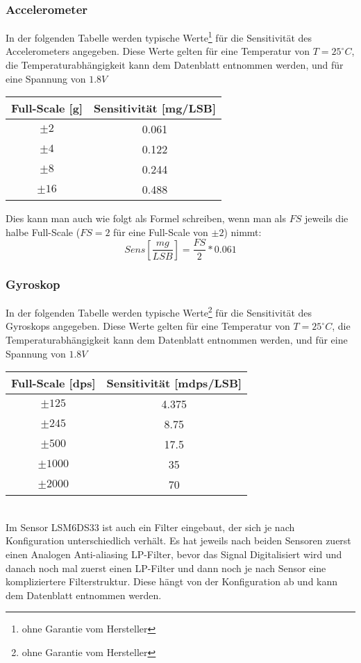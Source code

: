 \documentclass[a4paper, 12pt]{article}
\begin{document}
\subsubsection*{Accelerometer}
In der folgenden Tabelle werden typische Werte\footnote{ohne Garantie vom Hersteller} für die Sensitivität des Accelerometers angegeben.
Diese Werte gelten für eine Temperatur von $T = 25^\circ C$, die Temperaturabhängigkeit kann dem Datenblatt entnommen werden, und für eine Spannung von $1.8 V$
\begin{center}
	\begin{tabular}{c | c}
	Full-Scale [g] & Sensitivität [mg/LSB]\\\hline
	$\pm 2$ & 0.061\\
	$\pm 4$ & 0.122\\
	$\pm 8$ & 0.244\\
	$\pm 16$ & 0.488
\end{tabular}
\end{center}
Dies kann man auch wie folgt als Formel schreiben, wenn man als $FS$ jeweils die halbe Full-Scale ($FS = 2$ für eine Full-Scale von $\pm 2$) nimmt:\\
\[Sens \left[\frac{mg}{LSB}\right] = \frac{FS}{2}*0.061\]

\subsubsection*{Gyroskop}
In der folgenden Tabelle werden typische Werte\footnote{ohne Garantie vom Hersteller} für die Sensitivität des Gyroskops angegeben.
Diese Werte gelten für eine Temperatur von $T = 25^\circ C$, die Temperaturabhängigkeit kann dem Datenblatt entnommen werden, und für eine Spannung von $1.8 V$
\begin{center}
	\begin{tabular}{c | c}
	Full-Scale [dps] & Sensitivität [mdps/LSB]\\\hline
	$\pm 125$ & 4.375\\
	$\pm 245$ & 8.75\\
	$\pm 500$ & 17.5\\
	$\pm 1000$ & 35\\
	$\pm 2000$ & 70
\end{tabular}
\end{center}
~\\
Im Sensor LSM6DS33 ist auch ein Filter eingebaut, der sich je nach Konfiguration unterschiedlich verhält. Es hat jeweils nach beiden Sensoren zuerst einen Analogen Anti-aliasing LP-Filter, bevor das Signal Digitalisiert wird und danach noch mal zuerst einen LP-Filter und dann noch je nach Sensor eine kompliziertere Filterstruktur. Diese hängt von der Konfiguration ab und kann dem Datenblatt entnommen werden.
\end{document}

